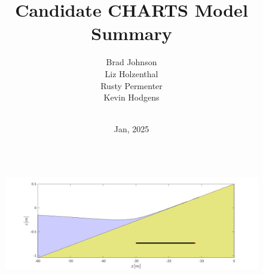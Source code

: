 \documentclass[aspectratio=169]{beamer}
\title[CHARTS]{Candidate CHARTS Model Summary} %
\author[]{Brad Johnson\\Liz Holzenthal\\Rusty Permenter \\Kevin Hodgens } %
\institute[ERDC] %
{USACE Engineering Research and Devlelopment Center \\ %
\medskip
\textit{} %
}
\date{\vspace*{-0cm}\\ Jan, 2025} %
\begin{document}
\begin{frame}
  \begin{columns}[c] %
    
    \titlepage %
    \begin{figure}
            \includegraphics[width=1\linewidth]{./present.png}
    \end{figure}
    
  \end{columns}
\end{frame}

\end{document}
